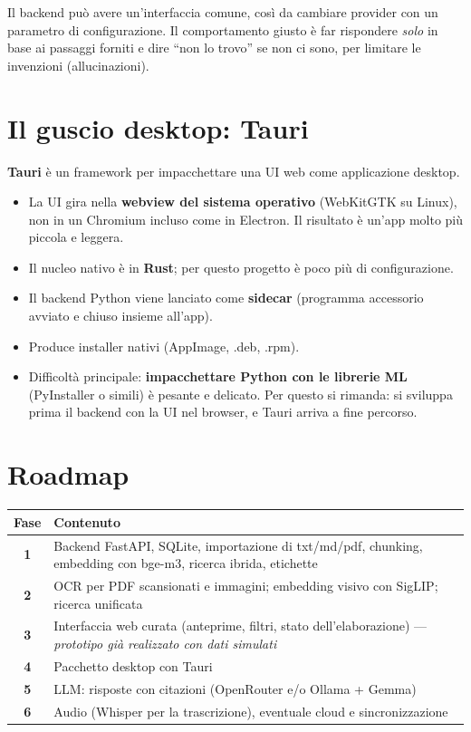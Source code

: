 \documentclass[11pt,a4paper]{article}
\newcommand{\hd}[1]{\textbf{\color{amber}#1}}
\newcommand{\tablehead}{\rowcolor{paper}}
\begin{document}
Il backend può avere un'interfaccia comune, così da cambiare provider con un parametro di configurazione. Il comportamento giusto è far rispondere \emph{solo} in base ai passaggi forniti e dire ``non lo trovo'' se non ci sono, per limitare le invenzioni (allucinazioni).

\section{Il guscio desktop: Tauri}

\textbf{Tauri} è un framework per impacchettare una UI web come applicazione desktop.
\begin{itemize}
  \item La UI gira nella \textbf{webview del sistema operativo} (WebKitGTK su Linux), non in un Chromium incluso come in Electron. Il risultato è un'app molto più piccola e leggera.
  \item Il nucleo nativo è in \textbf{Rust}; per questo progetto è poco più di configurazione.
  \item Il backend Python viene lanciato come \textbf{sidecar} (programma accessorio avviato e chiuso insieme all'app).
  \item Produce installer nativi (AppImage, .deb, .rpm).
  \item Difficoltà principale: \textbf{impacchettare Python con le librerie ML} (PyInstaller o simili) è pesante e delicato. Per questo si rimanda: si sviluppa prima il backend con la UI nel browser, e Tauri arriva a fine percorso.
\end{itemize}

\section{Roadmap}

\begin{center}
\small
\begin{tabularx}{\textwidth}{@{}>{\bfseries\color{amber}}c X@{}}
\toprule
\tablehead \hd{Fase} & \hd{Contenuto} \\
\midrule
1 & Backend FastAPI, SQLite, importazione di txt/md/pdf, chunking, embedding con bge-m3, ricerca ibrida, etichette \\
2 & OCR per PDF scansionati e immagini; embedding visivo con SigLIP; ricerca unificata \\
3 & Interfaccia web curata (anteprime, filtri, stato dell'elaborazione) --- \emph{prototipo già realizzato con dati simulati} \\
4 & Pacchetto desktop con Tauri \\
5 & LLM: risposte con citazioni (OpenRouter e/o Ollama + Gemma) \\
6 & Audio (Whisper per la trascrizione), eventuale cloud e sincronizzazione \\
\bottomrule
\end{tabularx}
\end{center}
\end{document}

